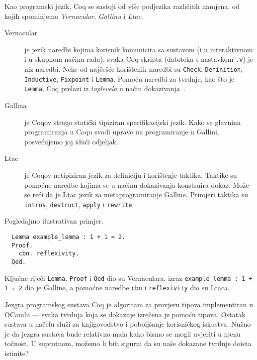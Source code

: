 Kao programski jezik, Coq se sastoji od više podjezika različitih namjena, od kojih spominjemo \textit{Vernacular}, \textit{Gallinu} i \textit{Ltac}.
\begin{description}
\item[Vernacular]  je jezik naredbi kojima korisnik komunicira sa sustavom (i u interaktivnom i u skupnom načinu rada);
  svaka Coq skripta (datoteka s nastavkom \texttt{.v}) je niz naredbi.
  Neke od najčešće korištenih naredbi su \texttt{Check}, \texttt{Definition}, \texttt{Inductive}, \texttt{Fixpoint} i \texttt{Lemma}.
  Pomoću naredbi za tvrdnje, kao što je \texttt{Lemma}, Coq prelazi iz \textit{toplevela} u način dokazivanja~.
\item[Gallina] je Coqov strogo statički tipiziran specifikacijski jezik.
  Kako se glavnina programiranja u Coqu svodi upravo na programiranje u Gallini, posvećujemo joj idući odjeljak.
\item[Ltac] je Coqov netipiziran jezik za definiciju i korištenje taktika.
  Taktike su pomoćne naredbe kojima se u načinu dokazivanja konstruira dokaz.
  Može se reći da je Ltac jezik za metaprogramiranje Galline.
  Primjeri taktika su \texttt{intros}, \texttt{destruct}, \texttt{apply} i \texttt{rewrite}.
\end{description} %
\noindent Pogledajmo ilustrativan primjer.
\begin{verbatim}
  Lemma example_lemma : 1 + 1 = 2.
  Proof.
    cbn. reflexivity.
  Qed.
\end{verbatim}
\noindent Ključne riječi \texttt{Lemma}, \texttt{Proof} i \texttt{Qed} dio su Vernaculara,
izraz \texttt{example\_lemma : 1 + 1 = 2} dio je Galline,
a pomoćne naredbe \texttt{cbn} i \texttt{reflexivity} dio su Ltaca.

Jezgra programskog sustava Coq je algoritam za provjeru tipova  implementiran u OCamlu ---
svaka tvrdnja koja se dokazuje izrečena je pomoću tipova.
Ostatak sustava u načelu služi za knjigovodstvo i poboljšanje korisničkog iskustva.
Nužno je da jezgra sustava bude relativno mala kako bismo se mogli uvjeriti u njenu točnost.
U suprotnom, možemo li biti sigurni da su naše dokazane tvrdnje doista istinite?

